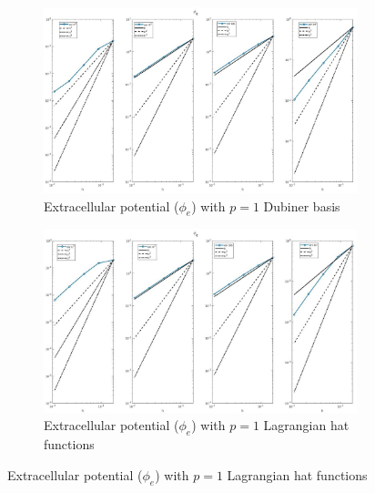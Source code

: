 \documentclass[a4paper,11pt]{article}
\begin{document}
\begin{figure}[H]
\caption{Comparison of the extracellular potential ($\phi_e$)}
\label{phie_1}
\begin{subfigure}{\textwidth}
\begin{center}
\includegraphics[width = \textwidth]{./D1_Phie_1.jpg}
\caption{Extracellular potential ($\phi_e$) with $p=1$ Dubiner basis}
\end{center}
\end{subfigure}
\begin{subfigure}{\textwidth}
\begin{center}
\includegraphics[width =\textwidth]{./P1_Phie_1.jpg}
\caption{Extracellular potential ($\phi_e$) with $p=1$ Lagrangian hat functions}
\end{center}
\end{subfigure}
\end{figure}
\newpage
\end{document}
